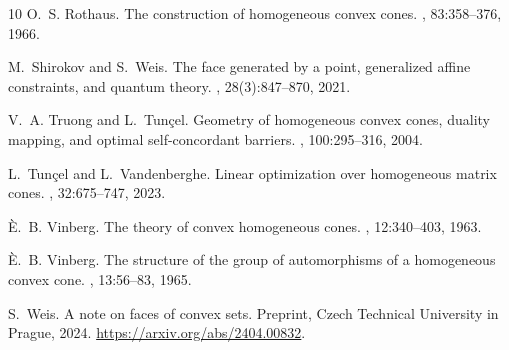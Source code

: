 \documentclass[oneside]{amsart}
\theoremstyle{plain}
\theoremstyle{definition}
\theoremstyle{remark}
\numberwithin{equation}{section}
\begin{document}
\begin{thebibliography}{10}
O.~S. Rothaus.
\newblock The construction of homogeneous convex cones.
, 83:358--376, 1966.

M.~Shirokov and S.~Weis.
\newblock The face generated by a point, generalized affine constraints, and
  quantum theory.
, 28(3):847--870, 2021.

V.~A. Truong and L.~Tun\c{c}el.
\newblock Geometry of homogeneous convex cones, duality mapping, and optimal
  self-concordant barriers.
, 100:295--316, 2004.

L.~Tun\c{c}el and L.~Vandenberghe.
\newblock Linear optimization over homogeneous matrix cones.
, 32:675--747, 2023.

 {\`E}.~B. Vinberg.
\newblock The theory of convex homogeneous cones.
, 12:340--403, 1963.

{\`E}.~B. Vinberg.
\newblock The structure of the group of automorphisms of a homogeneous convex
  cone.
, 13:56--83, 1965.

S.~Weis.
\newblock A note on faces of convex sets.
\newblock Preprint, Czech Technical University in Prague, 2024.
\newblock \url{https://arxiv.org/abs/2404.00832}.

\end{thebibliography}
\end{document}

